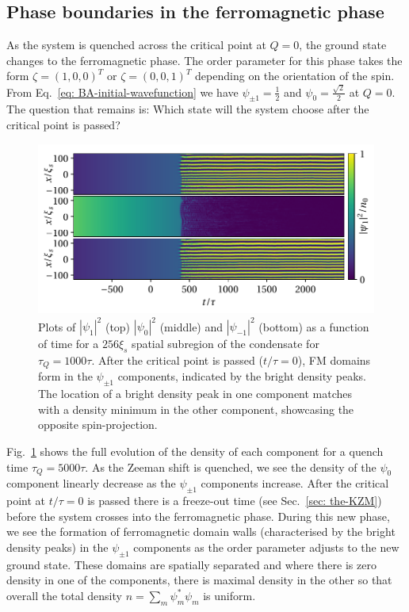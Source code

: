 \subsection{Phase boundaries in the ferromagnetic phase}
As the system is quenched across the critical point at \( Q = 0 \), the ground
state changes to the ferromagnetic phase.
The order parameter for this phase takes the form \(\zeta={(1,0,0)}^T\) or
\(\zeta={(0,0,1)}^T\) depending on the orientation of the spin.
From Eq.~\eqref{eq: BA-initial-wavefunction} we have
\(\psi_{\pm 1} = \frac{1}{2}\) and \(\psi_0 = \frac{\sqrt{2}}{2}\) at
\( Q = 0 \).
The question that remains is: Which state will the system choose after
the critical point is passed?
\begin{figure}[tb]
    \centering
    \includegraphics[width=\textwidth]{gfx/ch-spin1/BA-FM_all_densities.pdf}
    \caption[Component densities of the system as a function of time]
    {\label{fig: BA-FM-densities}
    Plots of \(|\psi_1|^2\) (top) \(|\psi_0|^2\) (middle) and
        \(|\psi_{-1}|^2\) (bottom) as a function of time for a \(256\xi_s\)
        spatial subregion of the condensate for
        \( \tau_Q=1000\tau \).
        After the critical point is passed (\(t/\tau=0\)), FM domains form in
        the \(\psi_{\pm 1}\) components, indicated by the bright density peaks.
        The location of a bright density peak in one component matches with a
        density minimum in the other component, showcasing the opposite
        spin-projection.}
\end{figure}
Fig.~\ref{fig: BA-FM-densities} shows the full evolution of the density of each
component for a quench time \( \tau_Q=5000\tau \).
As the Zeeman shift is quenched, we see the density of the \(\psi_0\) component
linearly decrease as the \(\psi_{\pm 1}\) components increase.
After the critical point at \(t/\tau=0\) is passed there is a freeze-out time
(see Sec.~\ref{sec: the-KZM}) before the system crosses into the ferromagnetic
phase.
During this new phase, we see the formation of ferromagnetic domain walls
(characterised by the bright density peaks) in the \(\psi_{\pm 1}\) components
as the order parameter adjusts to the new ground state.
These domains are spatially separated and where there is zero density in one of
the components, there is maximal density in the other so that overall the total
density \(n=\sum_m\psi_m^*\psi_m\) is uniform.

